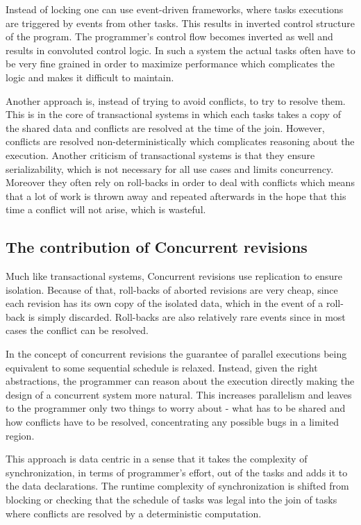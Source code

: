\documentclass[12pt,twoside,notitlepage]{report}
\begin{document}
Instead of locking one can use event-driven frameworks, where tasks executions are triggered by events from other tasks.  This results in inverted control structure of the program. The programmer's control flow becomes inverted as well and results in convoluted control logic. In such a system the actual tasks often have to be very fine grained in order to maximize performance which complicates the logic and makes it difficult to maintain.

Another approach is, instead of trying to avoid conflicts, to try to resolve them. This is in the core of transactional systems in which each tasks takes a copy of the shared data and conflicts are resolved at the time of the join. However, conflicts are resolved non-deterministically which complicates reasoning about the execution. Another criticism of transactional systems is that they ensure serializability, which is not necessary for all use cases and limits concurrency\cite{database}. Moreover they often rely on roll-backs in order to deal with conflicts which means that a lot of work is thrown away and repeated afterwards in the hope that this time a conflict will not arise, which is wasteful.   



\subsection{The contribution of Concurrent revisions}

Much like transactional systems, Concurrent revisions use replication to ensure isolation. Because of that, roll-backs of aborted revisions are very cheap, since each revision has its own copy of the isolated data, which in the event of a roll-back is simply discarded. Roll-backs are also relatively rare events since in most cases the conflict can be resolved. 

In the concept of concurrent revisions the guarantee of parallel executions being equivalent to some sequential schedule is relaxed. Instead, given the right abstractions, the programmer can reason about the execution directly making the design of a concurrent system more natural. This increases parallelism and leaves to the programmer only two things to worry about - what has to be shared and how conflicts have to be resolved, concentrating any possible bugs in a limited region.

This approach is data centric in a sense that it takes the complexity of synchronization, in terms of programmer's effort, out of the tasks and adds it to the data declarations. The runtime complexity of synchronization is shifted from blocking or checking that the schedule of tasks was legal into the join of tasks where conflicts are resolved by a deterministic computation.   
\end{document}
